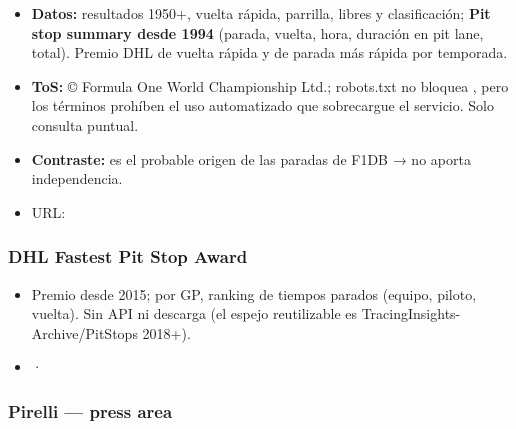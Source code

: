\begin{itemize}
\item \textbf{Datos:} resultados 1950+, vuelta rápida, parrilla, libres y clasificación; \textbf{Pit stop summary desde 1994} (parada, vuelta, hora, duración en pit lane, total). Premio DHL de vuelta rápida y de parada más rápida por temporada.
\item \textbf{ToS:} © Formula One World Championship Ltd.; robots.txt no bloquea , pero los términos prohíben el uso automatizado que sobrecargue el servicio. Solo consulta puntual.
\item \textbf{Contraste:} es el probable origen de las paradas de F1DB → no aporta independencia.
\item URL: \href{https://www.formula1.com/en/results/1994/races/606/pacific/pit-stop-summary}{}
\end{itemize}

\subsubsection{DHL Fastest Pit Stop Award}

\begin{itemize}
\item Premio desde 2015; por GP, ranking de tiempos parados (equipo, piloto, vuelta). Sin API ni descarga (el espejo reutilizable es TracingInsights-Archive/PitStops 2018+).
\item \href{https://inmotion.dhl/en/formula-1/fastest-pit-stop-award}{} · \href{https://en.wikipedia.org/wiki/DHL_Fastest_Pit_Stop_Award}{}
\end{itemize}

\subsubsection{Pirelli — press area}

